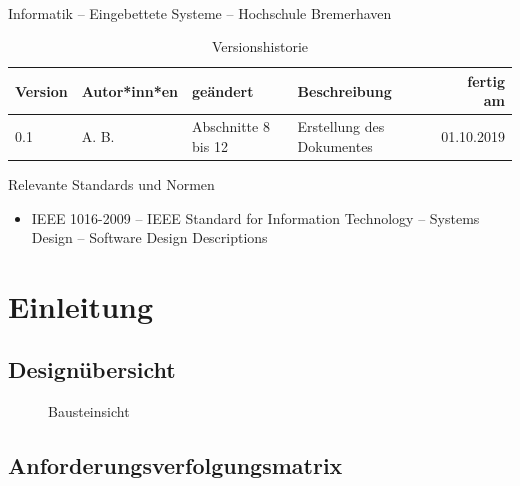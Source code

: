 \begin{center}
  \makeatletter
  \textbf{
    \@title
  }
  \makeatother
  \\[1em]
  Informatik -- Eingebettete Systeme -- Hochschule Bremerhaven
\end{center}

\begin{table}[ht]
  \centering
  \begin{tabular}[t]{|p{15mm}|p{30mm}|p{30mm}|p{50mm}|r|}
    \hline
    \textbf{Version} & \textbf{Autor*inn*en} & \textbf{geändert} & \textbf{Beschreibung} & \textbf{fertig am}\\
    \hline
    0.1              & A. B.            &  Abschnitte 8 bis 12  & Erstellung des Dokumentes & 01.10.2019\\
    \hline
  \end{tabular}
  \caption{Versionshistorie}
\end{table}

\vspace*{4em}

Relevante Standards und Normen
\begin{itemize}
\item IEEE 1016-2009 -- IEEE Standard for Information Technology --
  Systems Design -- Software Design Descriptions

  \cite{ieee-1016-2009-software-design-description}
\end{itemize}
\clearpage

\chapter{Einleitung}
\label{sdd:einleitung}

\section{Designübersicht}
\label{sdd:designuebersicht}

\begin{figure}[htp]
  \centering

  \textbf{}

  \caption{Bausteinsicht}
  \label{sdd:bausteinsicht}
\end{figure}

\section{Anforderungsverfolgungsmatrix}
\label{sdd:anforderungsmatrix}

